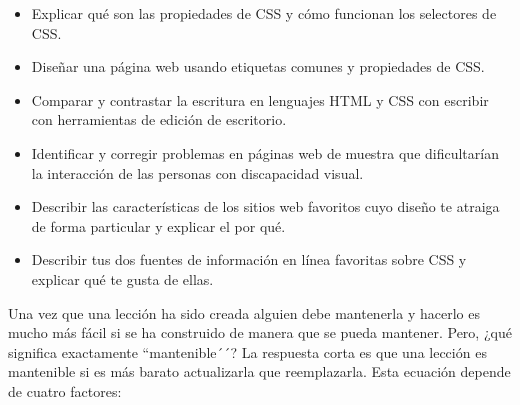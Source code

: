 \begin{itemize}
 
\item
  Explicar qué son las propiedades de CSS y cómo funcionan los selectores de CSS.
 
\item
  Diseñar una página web usando etiquetas comunes y propiedades de CSS.
 
\item
 Comparar y contrastar la escritura en lenguajes HTML y CSS
con escribir con herramientas de edición de escritorio.
 
\item
  Identificar y corregir problemas en páginas web de muestra
  que dificultarían la interacción de las personas con discapacidad visual.
 
\item
Describir las características de los sitios web favoritos
cuyo diseño te atraiga de forma particular
y explicar el por qué.
 
\item
  Describir tus dos fuentes de información en línea favoritas sobre
CSS y explicar qué te gusta de ellas.
 
\end{itemize}
 
 
Una vez que una lección ha sido creada alguien debe mantenerla
y hacerlo es mucho más fácil si se ha construido de manera que se pueda mantener.
Pero, ¿qué significa exactamente ``mantenible´´? 
La respuesta corta es que una lección es mantenible
si es más barato actualizarla que reemplazarla.
Esta ecuación depende de cuatro factores:
 
